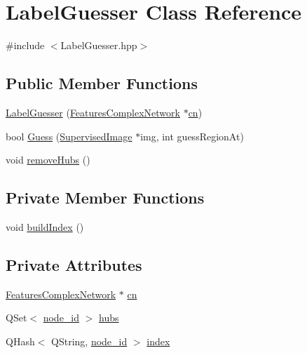 \hypertarget{class_label_guesser}{\section{Label\+Guesser Class Reference}
\label{class_label_guesser}
}


{\ttfamily \#include $<$Label\+Guesser.\+hpp$>$}

\subsection*{Public Member Functions}
\begin{DoxyCompactItemize}
\item 
\hyperlink{class_label_guesser_ad40858173b453bf95a7cd9798ff6a941}{Label\+Guesser} (\hyperlink{class_features_complex_network}{Features\+Complex\+Network} $\ast$\hyperlink{class_label_guesser_acdd5ba09b2a6aa6fadc4b64798bd4e75}{cn})
\item 
bool \hyperlink{class_label_guesser_a83c7361e8308a2347814a418c6165615}{Guess} (\hyperlink{class_supervised_image}{Supervised\+Image} $\ast$img, int guess\+Region\+At)
\item 
void \hyperlink{class_label_guesser_a34aabd99a651c08cd66df1ffa27767e5}{remove\+Hubs} ()
\end{DoxyCompactItemize}
\subsection*{Private Member Functions}
\begin{DoxyCompactItemize}
\item 
void \hyperlink{class_label_guesser_a28aeaaf6c7b4d8faeed2cd2f69da49a3}{build\+Index} ()
\end{DoxyCompactItemize}
\subsection*{Private Attributes}
\begin{DoxyCompactItemize}
\item 
\hyperlink{class_features_complex_network}{Features\+Complex\+Network} $\ast$ \hyperlink{class_label_guesser_acdd5ba09b2a6aa6fadc4b64798bd4e75}{cn}
\item 
Q\+Set$<$ \hyperlink{_complex_network_8hpp_a8323334ca788fde39682469321590d52}{node\+\_\+id} $>$ \hyperlink{class_label_guesser_a9a1306e306ecf90e6d886a45a1ed16f7}{hubs}
\item 
Q\+Hash$<$ Q\+String, \hyperlink{_complex_network_8hpp_a8323334ca788fde39682469321590d52}{node\+\_\+id} $>$ \hyperlink{class_label_guesser_ae88b5f0ad103084c7c8d7326c4bd7251}{index}
\end{DoxyCompactItemize}


